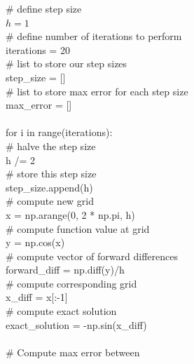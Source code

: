 \begin{example}
\begin{boxB}
\# define step size\\
$h = 1$\\
\# define number of iterations to perform\\
iterations = 20 \\
\# list to store our step sizes\\
step\_size = [] \\
\# list to store max error for each step size\\
max\_error = [] \\
\\
for i in range(iterations):\\
    \hspace*{0.5cm}\# halve the step size\\
    \hspace*{0.5cm}h /= 2 \\
    \hspace*{0.5cm}\# store this step size\\
    \hspace*{0.5cm}step\_size.append(h) \\
    \hspace*{0.5cm}\# compute new grid\\
    \hspace*{0.5cm}x = np.arange(0, 2 * np.pi, h) \\
    \hspace*{0.5cm}\# compute function value at grid\\
    \hspace*{0.5cm}y = np.cos(x) \\
    \hspace*{0.5cm}\# compute vector of forward differences\\
    \hspace*{0.5cm}forward\_diff = np.diff(y)/h \\
    \hspace*{0.5cm}\# compute corresponding grid\\
    \hspace*{0.5cm}x\_diff = x[:-1] \\
    \hspace*{0.5cm}\# compute exact solution\\
    \hspace*{0.5cm}exact\_solution = -np.sin(x\_diff) \\
\\    
    \hspace*{0.5cm}\# Compute max error between \\

\end{boxB}
\end{example}
